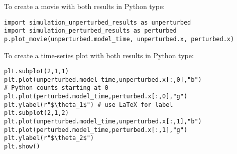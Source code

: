 To create a movie with both results in Python type:
\begin{lstlisting}[style=PythonStyle,caption={Python initialize}]
import simulation_unperturbed_results as unperturbed
import simulation_perturbed_results as perturbed
p.plot_movie(unperturbed.model_time, unperturbed.x, perturbed.x)
\end{lstlisting}

To create a time-series plot with both results in Python type:
\begin{lstlisting}[style=PythonStyle,caption={Python}]
plt.subplot(2,1,1)
plt.plot(unperturbed.model_time,unperturbed.x[:,0],"b") 
# Python counts starting at 0
plt.plot(perturbed.model_time,perturbed.x[:,0],"g")
plt.ylabel(r"$\theta_1$") # use LaTeX for label
plt.subplot(2,1,2)
plt.plot(unperturbed.model_time,unperturbed.x[:,1],"b")
plt.plot(perturbed.model_time,perturbed.x[:,1],"g")
plt.ylabel(r"$\theta_2$")
plt.show() \end{lstlisting}

